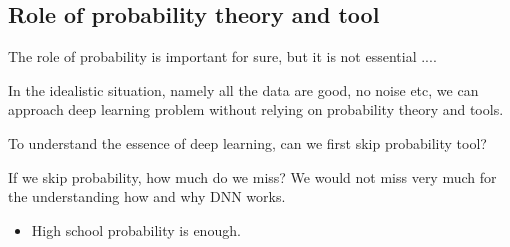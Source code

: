\subsection{Role of probability theory and tool}

The role of probability is important for sure, but it is not essential .... 

In the idealistic situation, namely all the data are good, no noise etc, we can approach deep learning problem without relying on probability theory and tools.

To understand the essence of deep learning, can we first skip probability tool?

If we skip probability, how much do we miss?   We would not miss very much for the understanding how and why DNN works. 

\begin{itemize}
\item High school probability is enough.
\end{itemize}

